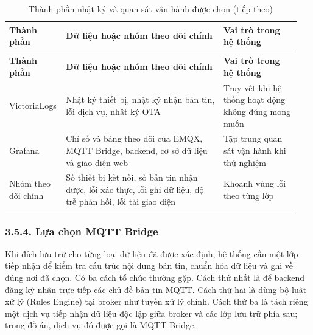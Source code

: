 \documentclass[a4paper]{extarticle}
\newcommand{\thesissettableid}[2]{%
  \renewcommand{\thetable}{#1}%
  \renewcommand{\theHtable}{#2}%
}
\begin{document}
{\thesissettableid{3.30}{condensed-bang-3-30-thanh-phan-nhat-ky-va-quan-sat-van-hanh-duoc-chon}
\def\LTcaptype{table}
\begin{longtable}{|L{0.160\linewidth}|L{0.530\linewidth}|L{0.260\linewidth}|}
\caption{Thành phần nhật ký và quan sát vận hành được chọn}\label{tab:condensed-bang-3-30-thanh-phan-nhat-ky-va-quan-sat-van-hanh-duoc-chon}\\
\hline
\textbf{Thành phần} & \textbf{Dữ liệu hoặc nhóm theo dõi chính} & \textbf{Vai trò trong hệ thống} \\
\hline
\endfirsthead
\caption[]{Thành phần nhật ký và quan sát vận hành được chọn (tiếp theo)}\\
\hline
\textbf{Thành phần} & \textbf{Dữ liệu hoặc nhóm theo dõi chính} & \textbf{Vai trò trong hệ thống} \\
\hline
\endhead
\endfoot
\endlastfoot
VictoriaLogs & Nhật ký thiết bị, nhật ký nhận bản tin, lỗi dịch vụ, nhật ký OTA & Truy vết khi hệ thống hoạt động không đúng mong muốn \\\hline
Grafana & Chỉ số và bảng theo dõi của EMQX, MQTT Bridge, backend, cơ sở dữ liệu và giao diện web & Tập trung quan sát vận hành khi thử nghiệm \\\hline
Nhóm theo dõi chính & Số thiết bị kết nối, số bản tin nhận được, lỗi xác thực, lỗi ghi dữ liệu, độ trễ phản hồi, lỗi tải giao diện & Khoanh vùng lỗi theo từng lớp \\\hline
\end{longtable}
}

\subsubsection{3.5.4. Lựa chọn MQTT Bridge}\label{lux1ef1a-chux1ecdn-mqtt-bridge}

Khi đích lưu trữ cho từng loại dữ liệu đã được xác định, hệ thống cần một lớp
tiếp nhận để kiểm tra cấu trúc nội dung bản tin, chuẩn hóa dữ liệu và ghi về
đúng nơi đã chọn. Có ba cách tổ chức thường gặp. Cách thứ nhất là để backend
đăng ký nhận trực tiếp các chủ đề bản tin MQTT. Cách thứ hai là dùng bộ luật xử lý (Rules
Engine) tại broker như tuyến xử lý chính. Cách thứ ba là tách riêng một dịch vụ
tiếp nhận dữ liệu độc lập giữa broker và các lớp lưu trữ phía sau; trong đồ án,
dịch vụ đó được gọi là MQTT Bridge.
\end{document}
